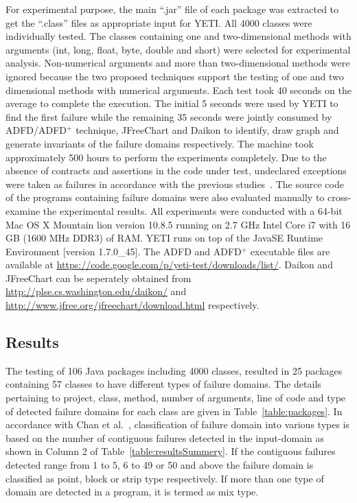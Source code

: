 For experimental purpose, the main ``.jar'' file of each package was extracted to get the ``.class'' files as appropriate input for YETI. All 4000 classes were individually tested. The classes containing one and two-dimensional methods with arguments (int, long, float, byte, double and short) were selected for experimental analysis. Non-numerical arguments and more than two-dimensional methods were ignored because the two proposed techniques support the testing of one and two dimensional methods with numerical arguments. Each test took 40 seconds on the average to complete the execution. The initial 5 seconds were used by YETI to find the first failure while the remaining 35 seconds were jointly consumed by ADFD/ADFD$^+$ technique, JFreeChart and Daikon to identify, draw graph and generate invariants of the failure domains respectively. The machine took approximately 500 hours to perform the experiments completely. Due to the absence of contracts and assertions in the code under test, undeclared exceptions were taken as failures in accordance with the previous studies~\cite{oriol2012random, ahmad2013adfd}. The source code of the programs containing failure domains were also evaluated manually to cross-examine the experimental results. All experiments were conducted with a 64-bit Mac OS X Mountain lion version 10.8.5 running on 2.7 GHz Intel Core i7 with 16 GB (1600 MHz DDR3) of RAM. YETI runs on top of the Java\texttrademark  SE Runtime Environment [version 1.7.0\_45]. The ADFD and ADFD$^+$ executable files are available at \url{https://code.google.com/p/yeti-test/downloads/list/}. Daikon and JFreeChart can be seperately obtained from \url{http://plse.cs.washington.edu/daikon/} and \url{http://www.jfree.org/jfreechart/download.html} respectively. 



\subsection{Results}
The testing of 106 Java packages including 4000 classes, resulted in 25 packages containing 57 classes to have different types of failure domains. The details pertaining to project, class, method, number of arguments, line of code and type of detected failure domains for each class are given in Table~\ref{table:packages}. In accordance with  Chan et al.~\cite{chan1996proportional}, classification of failure domain into various types is based on the number of contiguous failures detected in the input-domain as shown in Column 2 of Table~\ref{table:resultsSummery}. If the contiguous failures detected range from 1 to 5, 6 to 49 or 50 and above the failure domain is classified as point, block or strip type respectively. If more than one type of domain are detected in a program, it is termed as mix type.

